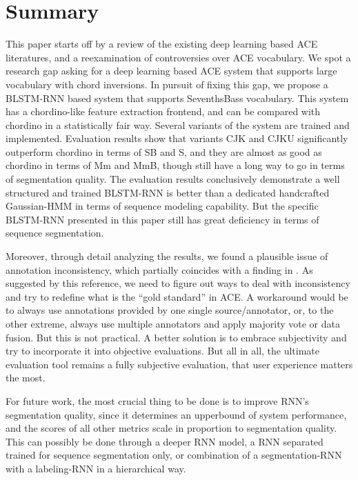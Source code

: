 \section{Summary}\label{sec:4-concln}
This paper starts off by a review of the existing deep learning based ACE literatures, and a reexamination of controversies over ACE vocabulary. We spot a research gap asking for a deep learning based ACE system that supports large vocabulary with chord inversions. In pursuit of fixing this gap, we propose a BLSTM-RNN based system that supports SeventhsBass vocabulary. This system has a chordino-like feature extraction frontend, and can be compared with chordino in a statistically fair way. Several variants of the system are trained and implemented. Evaluation results show that variants CJK and CJKU significantly outperform chordino in terms of SB and S, and they are almost as good as chordino in terms of Mm and MmB, though still have a long way to go in terms of segmentation quality. The evaluation results conclusively demonstrate a well structured and trained BLSTM-RNN is better than a dedicated handcrafted Gaussian-HMM in terms of sequence modeling capability. But the specific BLSTM-RNN presented in this paper still has great deficiency in terms of sequence segmentation.

Moreover, through detail analyzing the results, we found a plausible issue of annotation inconsistency, which partially coincides with a finding in \cite{humphreyfour}. As suggested by this reference, we need to figure out ways to deal with inconsistency and try to redefine what is the ``gold standard'' in ACE. A workaround would be to always use annotations provided by one single source/annotator, or, to the other extreme, always use multiple annotators and apply majority vote or data fusion. But this is not practical. A better solution is to embrace subjectivity and try to incorporate it into objective evaluations. But all in all, the ultimate evaluation tool remains a fully subjective evaluation, that user experience matters the most.

For future work, the most crucial thing to be done is to improve RNN's segmentation quality, since it determines an upperbound of system performance, and the scores of all other metrics scale in proportion to segmentation quality. This can possibly be done through a deeper RNN model, a RNN separated trained for sequence segmentation only, or combination of a segmentation-RNN with a labeling-RNN in a hierarchical way.





